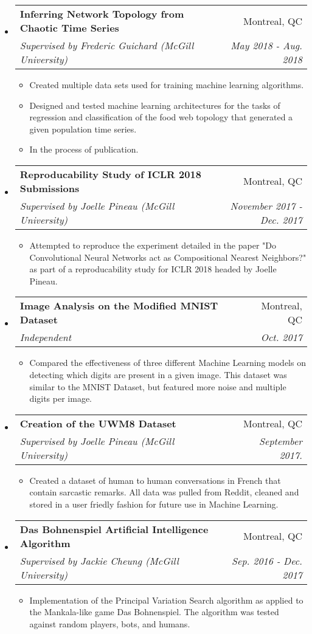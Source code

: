\documentclass[letterpaper,11pt]{article}
\makeatletter
\newcommand{\resitem}[1]{\item #1 \vspace{-2pt}}
\newcommand{\ressubheading}[4]{
\begin{tabular*}{6.1in}{l@{\extracolsep{\fill}}r}
		\textbf{#1} & #2 \\
		\textit{#3} & \textit{#4} \\
\end{tabular*}\vspace{-1pt}}
\makeatother
\begin{document}
\begin{itemize}

\item
	\ressubheading{Inferring Network Topology from Chaotic Time Series}{Montreal, QC}{Supervised by Frederic Guichard (McGill University)}{May 2018 - Aug. 2018}
	\begin{itemize}
		\resitem{Created multiple data sets used for training machine learning algorithms.}
		\resitem{Designed and tested machine learning architectures for the tasks of regression and classification of the food web topology that generated a given population time series.}
		\resitem{In the process of publication.}
	\end{itemize}
	
\item
	\ressubheading{Reproducability Study of ICLR 2018 Submissions}{Montreal, QC}{Supervised by Joelle Pineau (McGill University)}{November 2017 - Dec. 2017}
	\begin{itemize}
		\resitem{Attempted to reproduce the experiment detailed in the paper "Do Convolutional Neural Networks act as Compositional Nearest Neighbors?" as part of a reproducability study for ICLR 2018 headed by Joelle Pineau.}
	\end{itemize}	

\item
	\ressubheading{Image Analysis on the Modified MNIST Dataset}{Montreal, QC}{Independent}{Oct. 2017}
	\begin{itemize}
		\resitem{Compared the effectiveness of three different Machine Learning models on detecting which digits are present in a given image. This dataset was similar to the MNIST Dataset, but featured more noise and multiple digits per image. }
	\end{itemize}
	
\item 
    \ressubheading{Creation of the UWM8 Dataset}{Montreal, QC}{Supervised by Joelle Pineau (McGill University)}{September 2017.}
    \begin{itemize}
        \resitem{Created a dataset of human to human conversations in French that contain sarcastic remarks. All data was pulled from Reddit, cleaned and stored in a user friedly fashion for future use in Machine Learning.}
    \end{itemize}
	
\item
	\ressubheading{Das Bohnenspiel Artificial Intelligence Algorithm}{Montreal, QC}{Supervised by Jackie Cheung (McGill University)}{Sep. 2016 - Dec. 2017}
	\begin{itemize}
		\resitem{Implementation of the Principal Variation Search algorithm as applied to the Mankala-like game Das Bohnenspiel. The algorithm was tested against random players, bots, and humans.}
	\end{itemize}
	

\end{itemize}
\end{document}
